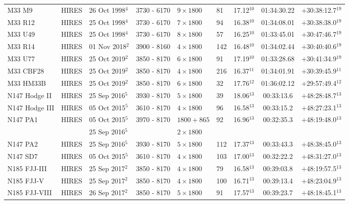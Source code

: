\documentclass{aa}
\begin{document}
\begin{appendix}
\begin{table*}[h!]
{\begin{tabular}{llllllccc}
M33 M9 & HIRES & 26 Oct 1998$^{4}$ & 3730 - 6170 & $9\times1800$ & 81  & 17.12$^{10}$ & 01:34:30.22 & $+$30:38:12.7$^{19}$ \\
M33 R12 & HIRES & 25 Oct 1998$^{4}$ & 3730 - 6170 & $7\times1800$ & 94  & 16.38$^{10}$ & 01:34:08.01 & $+$30:38:38.0$^{19}$ \\
M33 U49 & HIRES & 25 Oct 1998$^{4}$ & 3730 - 6170 & $8\times1800$ & 57  & 16.25$^{10}$ & 01:33:45.01 & $+$30:47:46.7$^{19}$ \\
M33 R14 & HIRES & 01 Nov 2018$^{2}$ & 3900 - 8160 & $4\times1800$ & 142  & 16.48$^{10}$ & 01:34:02.44 & $+$30:40:40.6$^{19}$ \\
M33 U77 & HIRES & 25 Oct 2019$^{2}$ & 3850 - 8170 & $6\times1800$ & 91  & 17.19$^{10}$ & 01:33:28.68 & $+$30:41:34.9$^{19}$ \\
M33 CBF28 & HIRES & 25 Oct 2019$^{2}$ & 3850 - 8170 & $4\times1800$ & 216  & 16.37$^{11}$ & 01:34:01.91 & $+$30:39:45.9$^{11}$ \\
M33 HM33B & HIRES & 25 Oct 2019$^{2}$ & 3850 - 8170 & $6\times1800$ & 32  & 17.76$^{12}$ & 01:36:02.12 & $+$29:57:49.4$^{12}$ \\
N147 Hodge II & HIRES & 25 Sep 2016$^{5}$ & 3930 - 8170 & $5\times1800$ & 39  & 18.06$^{13}$ & 00:33:13.6 & $+$48:28:48.7$^{13}$ \\
N147 Hodge III & HIRES & 05 Oct 2015$^{5}$ & 3610 - 8170 & $4\times1800$ & 96  & 16.58$^{13}$ & 00:33:15.2 & $+$48:27:23.1$^{13}$ \\
N147 PA1 & HIRES & 05 Oct 2015$^{5}$ & 3970 - 8170 & $1800+865$ & 92  & 16.96$^{13}$ & 00:32:35.3 & $+$48:19:48.0$^{13}$ \\
           & & 25 Sep 2016$^{5}$ & & $2\times1800$ \\
N147 PA2 & HIRES & 25 Sep 2016$^{5}$ & 3930 - 8170 & $5\times1800$ & 112  & 17.37$^{13}$ & 00:33:43.3 & $+$48:38:45.0$^{13}$ \\
N147 SD7 & HIRES & 05 Oct 2015$^{5}$ & 3610 - 8170 & $4\times1800$ & 103  & 17.00$^{13}$ & 00:32:22.2 & $+$48:31:27.0$^{13}$ \\
N185 FJJ-III & HIRES & 25 Sep 2017$^{2}$ & 3850 - 8170 & $4\times1800$ & 79  & 16.58$^{13}$ & 00:39:03.8 & $+$48:19:57.5$^{13}$ \\
N185 FJJ-V & HIRES & 25 Sep 2017$^{2}$ & 3850 - 8170 & $4\times1800$ & 100  & 16.71$^{13}$ & 00:39:13.4 & $+$48:23:04.9$^{13}$ \\
N185 FJJ-VIII & HIRES & 26 Sep 2017$^{2}$ & 3850 - 8170 & $5\times1800$ & 91  & 17.57$^{13}$ & 00:39:23.7 & $+$48:18:45.1$^{13}$ \\

\end{tabular}}
\end{table*}
\end{appendix}
\end{document}
